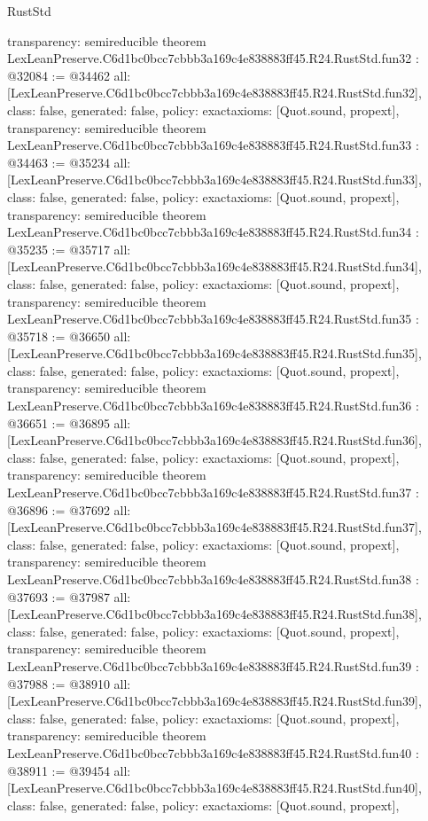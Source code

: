 \begin{lexlean}{RustStd}
\begin{coremodule}
{  transparency: semireducible
}
theorem LexLeanPreserve.C6d1bc0bcc7cbbb3a169c4e838883ff45.R24.RustStd.fun32 : @32084 := @34462 {
  all: [LexLeanPreserve.C6d1bc0bcc7cbbb3a169c4e838883ff45.R24.RustStd.fun32],
  class: false,
  generated: false,
  policy: exact{axioms: [Quot.sound, propext]},
  transparency: semireducible
}
theorem LexLeanPreserve.C6d1bc0bcc7cbbb3a169c4e838883ff45.R24.RustStd.fun33 : @34463 := @35234 {
  all: [LexLeanPreserve.C6d1bc0bcc7cbbb3a169c4e838883ff45.R24.RustStd.fun33],
  class: false,
  generated: false,
  policy: exact{axioms: [Quot.sound, propext]},
  transparency: semireducible
}
theorem LexLeanPreserve.C6d1bc0bcc7cbbb3a169c4e838883ff45.R24.RustStd.fun34 : @35235 := @35717 {
  all: [LexLeanPreserve.C6d1bc0bcc7cbbb3a169c4e838883ff45.R24.RustStd.fun34],
  class: false,
  generated: false,
  policy: exact{axioms: [Quot.sound, propext]},
  transparency: semireducible
}
theorem LexLeanPreserve.C6d1bc0bcc7cbbb3a169c4e838883ff45.R24.RustStd.fun35 : @35718 := @36650 {
  all: [LexLeanPreserve.C6d1bc0bcc7cbbb3a169c4e838883ff45.R24.RustStd.fun35],
  class: false,
  generated: false,
  policy: exact{axioms: [Quot.sound, propext]},
  transparency: semireducible
}
theorem LexLeanPreserve.C6d1bc0bcc7cbbb3a169c4e838883ff45.R24.RustStd.fun36 : @36651 := @36895 {
  all: [LexLeanPreserve.C6d1bc0bcc7cbbb3a169c4e838883ff45.R24.RustStd.fun36],
  class: false,
  generated: false,
  policy: exact{axioms: [Quot.sound, propext]},
  transparency: semireducible
}
theorem LexLeanPreserve.C6d1bc0bcc7cbbb3a169c4e838883ff45.R24.RustStd.fun37 : @36896 := @37692 {
  all: [LexLeanPreserve.C6d1bc0bcc7cbbb3a169c4e838883ff45.R24.RustStd.fun37],
  class: false,
  generated: false,
  policy: exact{axioms: [Quot.sound, propext]},
  transparency: semireducible
}
theorem LexLeanPreserve.C6d1bc0bcc7cbbb3a169c4e838883ff45.R24.RustStd.fun38 : @37693 := @37987 {
  all: [LexLeanPreserve.C6d1bc0bcc7cbbb3a169c4e838883ff45.R24.RustStd.fun38],
  class: false,
  generated: false,
  policy: exact{axioms: [Quot.sound, propext]},
  transparency: semireducible
}
theorem LexLeanPreserve.C6d1bc0bcc7cbbb3a169c4e838883ff45.R24.RustStd.fun39 : @37988 := @38910 {
  all: [LexLeanPreserve.C6d1bc0bcc7cbbb3a169c4e838883ff45.R24.RustStd.fun39],
  class: false,
  generated: false,
  policy: exact{axioms: [Quot.sound, propext]},
  transparency: semireducible
}
theorem LexLeanPreserve.C6d1bc0bcc7cbbb3a169c4e838883ff45.R24.RustStd.fun40 : @38911 := @39454 {
  all: [LexLeanPreserve.C6d1bc0bcc7cbbb3a169c4e838883ff45.R24.RustStd.fun40],
  class: false,
  generated: false,
  policy: exact{axioms: [Quot.sound, propext]},
}
\end{coremodule}
\end{lexlean}
